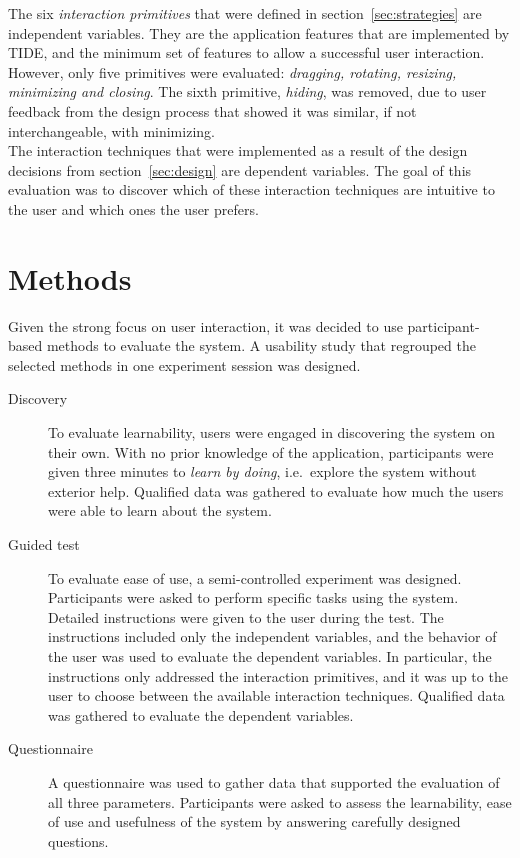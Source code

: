 The six \emph{interaction primitives} that were defined in section~\ref{sec:strategies} are independent variables.
They are the application features that are implemented by TIDE, and the minimum set of features to allow a successful user interaction.
However, only five primitives were evaluated: \emph{dragging, rotating, resizing, minimizing and closing}.
The sixth primitive, \emph{hiding}, was removed, due to user feedback from the design process that showed it was similar, if not interchangeable, with minimizing.
\\
\linebreak
The interaction techniques that were implemented as a result of the design decisions from section~\ref{sec:design} are dependent variables.
The goal of this evaluation was to discover which of these interaction techniques are intuitive to the user and which ones the user prefers. 


\section{Methods}
\label{sec:methods}

Given the strong focus on user interaction, it was decided to use participant-based methods to evaluate the system.
A usability study that regrouped the selected methods in one experiment session was designed.

\begin{description}

\item[Discovery]

To evaluate learnability, users were engaged in discovering the system on their own.
With no prior knowledge of the application, participants were given three minutes to \emph{learn by doing}, i.e.\ explore the system without exterior help.
Qualified data was gathered to evaluate how much the users were able to learn about the system.

\item[Guided test]

To evaluate ease of use, a semi-controlled experiment was designed.
Participants were asked to perform specific tasks using the system.
Detailed instructions were given to the user during the test.
The instructions included only the independent variables, and the behavior of the user was used to evaluate the dependent variables.
In particular, the instructions only addressed the interaction primitives, and it was up to the user to choose between the available interaction techniques.
Qualified data was gathered to evaluate the dependent variables.

\item[Questionnaire]

A questionnaire was used to gather data that supported the evaluation of all three parameters.
Participants were asked to assess the learnability, ease of use and usefulness of the system by answering carefully designed questions.

\end{description}


